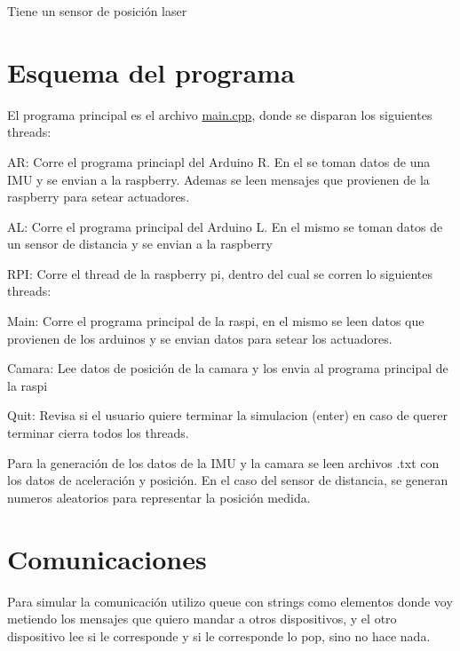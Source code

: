 \begin{DoxyItemize}
\item Tiene un sensor de posición laser
\end{DoxyItemize}\hypertarget{index_autotoc_md6}{}\section{Esquema del programa}\label{index_autotoc_md6}
El programa principal es el archivo \hyperlink{main_8cpp}{main.\+cpp}, donde se disparan los siguientes threads\+:
\begin{DoxyItemize}
\item AR\+: Corre el programa princiapl del Arduino R. En el se toman datos de una I\+MU y se envian a la raspberry. Ademas se leen mensajes que provienen de la raspberry para setear actuadores.
\item AL\+: Corre el programa principal del Arduino L. En el mismo se toman datos de un sensor de distancia y se envian a la raspberry
\item R\+PI\+: Corre el thread de la raspberry pi, dentro del cual se corren lo siguientes threads\+:
\begin{DoxyItemize}
\item Main\+: Corre el programa principal de la raspi, en el mismo se leen datos que provienen de los arduinos y se envian datos para setear los actuadores.
\item Camara\+: Lee datos de posición de la camara y los envia al programa principal de la raspi
\end{DoxyItemize}
\item Quit\+: Revisa si el usuario quiere terminar la simulacion (enter) en caso de querer terminar cierra todos los threads.
\end{DoxyItemize}

Para la generación de los datos de la I\+MU y la camara se leen archivos .txt con los datos de aceleración y posición. En el caso del sensor de distancia, se generan numeros aleatorios para representar la posición medida.\hypertarget{index_autotoc_md7}{}\section{Comunicaciones}\label{index_autotoc_md7}
Para simular la comunicación utilizo queue con strings como elementos donde voy metiendo los mensajes que quiero mandar a otros dispositivos, y el otro dispositivo lee si le corresponde y si le corresponde lo pop, sino no hace nada.

